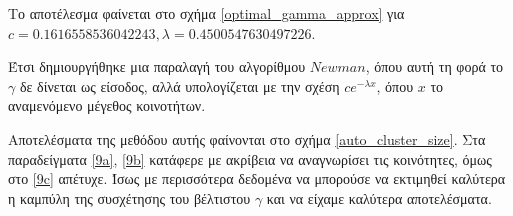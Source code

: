 \documentclass[12pt, letterpaper]{article}
\begin{document}
Το αποτέλεσμα φαίνεται στο σχήμα \ref{optimal_gamma_approx} για $c = 0.1616558536042243, \lambda = 0.4500547630497226$.

Έτσι δημιουργήθηκε μια παραλαγή του αλγορίθμου $Newman$, όπου αυτή τη φορά 
το $\gamma$ δε δίνεται ως είσοδος, αλλά υπολογίζεται με την σχέση $ce^{-\lambda x}$,
όπου $x$ το αναμενόμενο μέγεθος κοινοτήτων.

Αποτελέσματα της μεθόδου αυτής φαίνονται στο σχήμα \ref{auto_cluster_size}.
Στα παραδείγματα \ref{9a}, \ref{9b} κατάφερε με ακρίβεια να αναγνωρίσει 
τις κοινότητες, όμως στο \ref{9c} απέτυχε. Ίσως με περισσότερα δεδομένα 
να μπορούσε να εκτιμηθεί καλύτερα η καμπύλη της συσχέτησης του βέλτιστου $\gamma$
και να είχαμε καλύτερα αποτελέσματα. 
\end{document}
